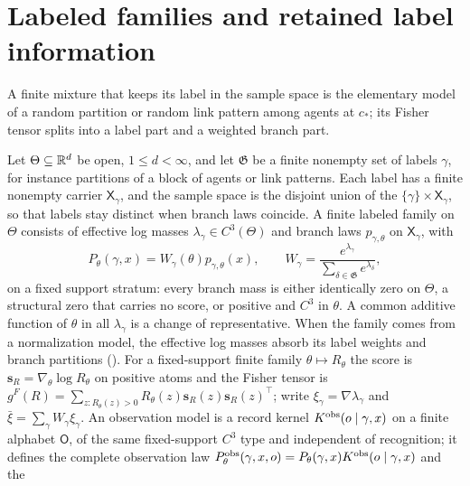 \section{Labeled families and retained label information}
\label{sec:rg-thermo-finite-experiment}

A finite mixture that keeps its label in the sample space is the elementary model of a random
partition or random link pattern among agents at $c_*$; its Fisher tensor splits into a label part
and a weighted branch part.

\label{def:rg-thermo-finite-score}
\label{hyp:rg-thermo-finite-support}
\label{eq:rg-thermo-label-family}
\label{eq:rg-thermo-finite-fisher-definition}
Let $\Theta\subseteq\mathbb R^d$ be open, $1\leq d<\infty$, and let $\mathfrak G$ be a finite nonempty
set of labels $\gamma$, for instance partitions of a block of agents or link patterns. Each label
has a finite nonempty carrier $\mathsf X_\gamma$, and the sample space is the disjoint union of the
$\{\gamma\}\times\mathsf X_\gamma$, so that labels stay distinct when branch laws coincide. A finite
labeled family on $\Theta$ consists of effective log masses $\lambda_\gamma\in C^3(\Theta)$ and
branch laws $p_{\gamma,\theta}$ on $\mathsf X_\gamma$, with
\begin{equation}
P_\theta(\gamma,x)=W_\gamma(\theta)p_{\gamma,\theta}(x),
\qquad
W_\gamma=\frac{e^{\lambda_\gamma}}{\sum_{\delta\in\mathfrak G}e^{\lambda_\delta}},
\label{eq:rg-thermo-finite-log-masses}
\end{equation}
on a fixed support stratum: every branch mass is either identically zero on $\Theta$, a structural
zero that carries no score, or positive and $C^3$ in $\theta$. A common additive function of
$\theta$ in all $\lambda_\gamma$ is a change of representative. When the family comes from a
normalization model, the effective log masses absorb its label weights and branch partitions
(). For a fixed-support finite family $\theta\mapsto R_\theta$ the
score is $\mathbf s_R=\nabla_\theta\log R_\theta$ on positive atoms and the Fisher tensor is
$g^F(R)=\sum_{z:R_\theta(z)>0}R_\theta(z)\mathbf s_R(z)\mathbf s_R(z)^\top$; write
$\xi_\gamma=\nabla\lambda_\gamma$ and $\bar\xi=\sum_\gamma W_\gamma\xi_\gamma$. An observation model
is a record kernel $K^{\mathrm{obs}}(o\mid\gamma,x)$ on a finite alphabet $\mathsf O$, of the same
fixed-support $C^3$ type and independent of recognition; it defines the complete observation law
$P^{\mathrm{obs}}_\theta(\gamma,x,o)=P_\theta(\gamma,x)K^{\mathrm{obs}}(o\mid\gamma,x)$ and the
